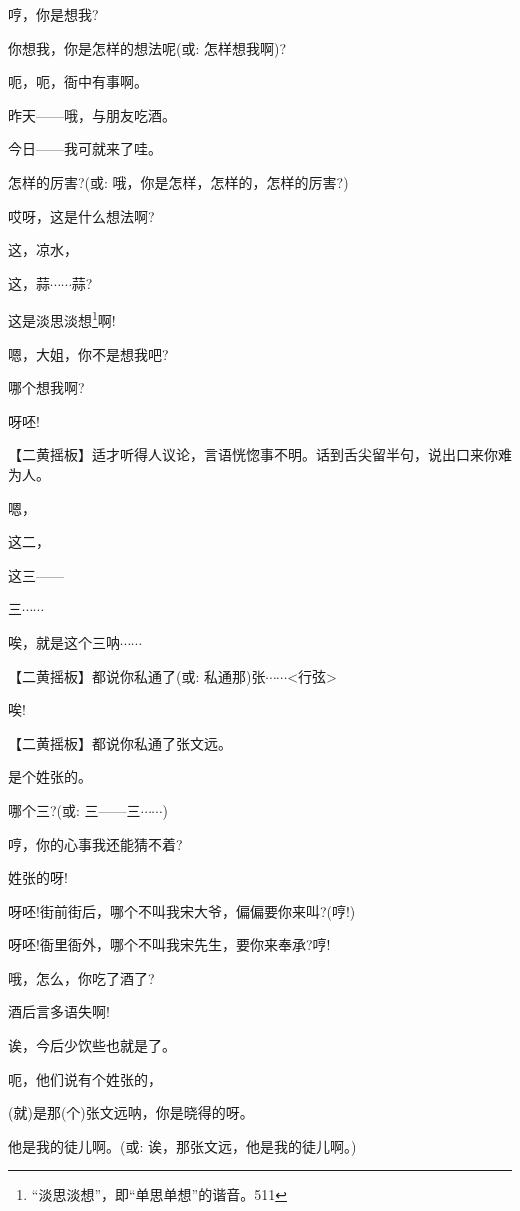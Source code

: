 {哼，你是想我?}

{你想我，你是怎样的想法呢({\akai 或}: 怎样想我啊)?}

{呃，呃，衙中有事啊。}

{昨天------哦，与朋友吃酒。}

{今日------我可就来了哇。}

{怎样的厉害?({\akai 或}: 哦，你是怎样，怎样的，怎样的厉害?)}

{哎呀，这是什么想法啊?}

{这，凉水，}

{这，蒜$\cdots{}\cdots{}$蒜?}

{这是淡思淡想}\footnote{ ``淡思淡想''，即``单思单想''的谐音。{511}}{啊!}

{嗯，大姐，你不是想我吧?}

{哪个想我啊?}

{呀呸!}

\setlength{\hangindent}{60pt} {【{\akai 二黄摇板}】适才听得人议论，言语恍惚事不明。话到舌尖留半句，说出口来你难为人。}

{嗯，}

{这二，}

{这三------}

{三$\cdots{}\cdots{}$}

{唉，就是这个三呐$\cdots{}\cdots{}$}

\setlength{\hangindent}{60pt} {【{\akai 二黄摇板}】都说你私通了({\akai 或}: 私通那)张$\cdots{}\cdots{}$\textless{}行弦\textgreater{}}

{唉!}

\setlength{\hangindent}{60pt} {【{\akai 二黄摇板}】都说你私通了张文远。}

{是个姓张的。}

{哪个三?({\akai 或}: 三------三$\cdots{}\cdots{}$)}

{哼，你的心事我还能猜不着?}

{姓张的呀!}

{呀呸!街前街后，哪个不叫我宋大爷，偏偏要你来叫?(哼!)}

{呀呸!衙里衙外，哪个不叫我宋先生，要你来奉承?哼!}

{哦，怎么，你吃了酒了?}

{酒后言多语失啊!}

{诶，今后少饮些也就是了。}

{呃，他们说有个姓张的，}

{(就)是那(个)张文远呐，你是晓得的呀。}

{他是我的徒儿啊。({\akai 或}: 诶，那张文远，他是我的徒儿啊。)}


